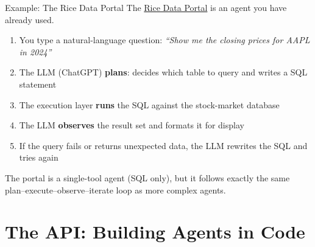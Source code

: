 \documentclass[aspectratio=169]{beamer}
\begin{document}
\begin{frame}{Example: The Rice Data Portal}
The \href{https://data-portal.rice-business.org}{Rice Data Portal} is an agent you have already used.
\vspace{0.3cm}
\begin{enumerate}
  \item You type a natural-language question: \textit{``Show me the closing prices for AAPL in 2024''}
  \item The LLM (ChatGPT) \textbf{plans}: decides which table to query and writes a SQL statement
  \item The execution layer \textbf{runs} the SQL against the stock-market database
  \item The LLM \textbf{observes} the result set and formats it for display
  \item If the query fails or returns unexpected data, the LLM rewrites the SQL and tries again
\end{enumerate}
\vspace{0.3cm}
The portal is a single-tool agent (SQL only), but it follows exactly the same \alert{plan--execute--observe--iterate} loop as more complex agents.
\end{frame}

\section{The API: Building Agents in Code}
\end{document}
